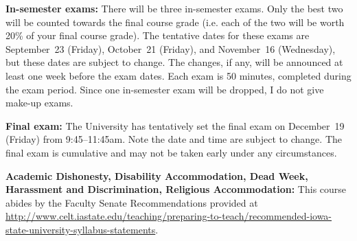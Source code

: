 \documentclass[10pt]{article}
\newcommand{\sep}{\vspace*{0.4cm}}
\newcommand{\tab}{\hspace*{0.8cm}}
\begin{document}
\tab \textbf{In-semester exams:}
There will be three in-semester exams. Only the best two will be counted towards the final course grade (i.e. each of the two will be worth 20\% of your final course grade).
The tentative dates for these exams are September~23 (Friday), October~21
(Friday), and November~16 (Wednesday), but these dates are subject to change. 
The changes, if any, will be announced at least one week before the exam dates.
Each exam is 50 minutes, completed during the exam period.
Since one in-semester exam will be dropped, I do not give make-up exams.
\sep

\tab \textbf{Final exam:}
The University has tentatively set the final exam on December~19 (Friday)
from 9:45--11:45am. Note the date and time are subject to change.
The final exam is cumulative and may not be taken early under any circumstances.
\sep

\tab \textbf{Academic Dishonesty, Disability Accommodation, Dead Week, Harassment and Discrimination, Religious Accommodation:} This course abides by the Faculty Senate Recommendations provided at \url{http://www.celt.iastate.edu/teaching/preparing-to-teach/recommended-iowa-state-university-syllabus-statements}.
\end{document}
